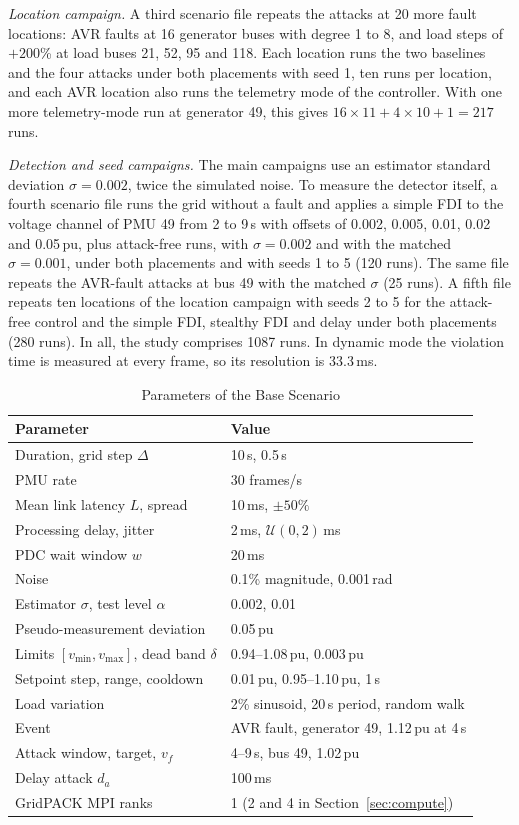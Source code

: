 \documentclass[journal]{IEEEtran}
\newcommand{\pu}{\,pu}
\begin{document}
\emph{Location campaign.} A third scenario file repeats the attacks at 20 more fault locations: AVR faults at 16 generator buses with degree 1 to 8, and load steps of $+200$\% at load buses 21, 52, 95 and 118. Each location runs the two baselines and the four attacks under both placements with seed 1, ten runs per location, and each AVR location also runs the telemetry mode of the controller. With one more telemetry-mode run at generator 49, this gives $16 \times 11 + 4 \times 10 + 1 = 217$ runs.

\emph{Detection and seed campaigns.} The main campaigns use an estimator standard deviation $\sigma = 0.002$, twice the simulated noise. To measure the detector itself, a fourth scenario file runs the grid without a fault and applies a simple FDI to the voltage channel of PMU 49 from 2 to 9\,s with offsets of 0.002, 0.005, 0.01, 0.02 and 0.05\pu, plus attack-free runs, with $\sigma = 0.002$ and with the matched $\sigma = 0.001$, under both placements and with seeds 1 to 5 (120 runs). The same file repeats the AVR-fault attacks at bus 49 with the matched $\sigma$ (25 runs). A fifth file repeats ten locations of the location campaign with seeds 2 to 5 for the attack-free control and the simple FDI, stealthy FDI and delay under both placements (280 runs). In all, the study comprises 1087 runs. In dynamic mode the violation time is measured at every frame, so its resolution is 33.3\,ms.

\begin{table}[t]
\caption{Parameters of the Base Scenario}
\label{tab:params}
\centering
\footnotesize
\begin{tabular}{@{}P{4.1cm}P{3.6cm}@{}}
\toprule
Parameter & Value \\
\midrule
Duration, grid step $\Delta$ & 10\,s, 0.5\,s \\
PMU rate & 30 frames/s \\
Mean link latency $L$, spread & 10\,ms, $\pm50\%$ \\
Processing delay, jitter & 2\,ms, $\mathcal{U}(0,2)$\,ms \\
PDC wait window $w$ & 20\,ms \\
Noise & 0.1\% magnitude, 0.001\,rad \\
Estimator $\sigma$, test level $\alpha$ & 0.002, 0.01 \\
Pseudo-measurement deviation & 0.05\pu \\
Limits $[v_{\min}, v_{\max}]$, dead band $\delta$ & 0.94--1.08\pu, 0.003\pu \\
Setpoint step, range, cooldown & 0.01\pu, 0.95--1.10\pu, 1\,s \\
Load variation & 2\% sinusoid, 20\,s period, random walk \\
Event & AVR fault, generator 49, 1.12\pu{} at 4\,s \\
Attack window, target, $v_f$ & 4--9\,s, bus 49, 1.02\pu \\
Delay attack $d_a$ & 100\,ms \\
GridPACK MPI ranks & 1 (2 and 4 in Section~\ref{sec:compute}) \\
\bottomrule
\end{tabular}
\end{table}
\end{document}
